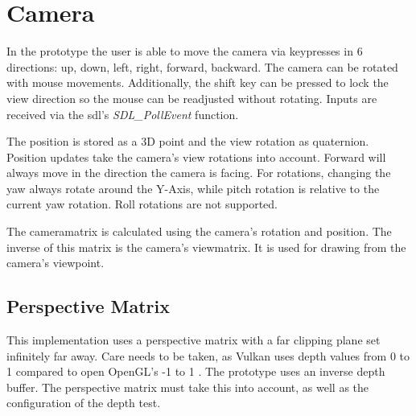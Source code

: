 








\section{Camera}
In the prototype the user is able to move the camera via keypresses in 6 directions: up, down, left, right, forward, backward. The camera can be rotated with mouse movements. Additionally, the shift key can be pressed to lock the view direction so the mouse can be readjusted without rotating. Inputs are received via the \gls{sdl}'s \cite{sdl} \textit{SDL\_PollEvent} function.

The position is stored as a 3D point and the view rotation as quaternion. Position updates take the camera's view rotations into account. Forward will always move in the direction the camera is facing. For rotations, changing the yaw always rotate around the Y-Axis, while pitch rotation is relative to the current yaw rotation. Roll rotations are not supported.

The \gls{cameramatrix} is calculated using the camera's rotation and position. The inverse of this matrix is the camera's \gls{viewmatrix}. It is used for drawing from the camera's viewpoint.

\subsection{Perspective Matrix}
This implementation uses a perspective matrix with a far clipping plane set infinitely far away. Care needs to be taken, as Vulkan uses depth values from 0 to 1 \cite{khronos:vulkan:spec1.1} compared to open OpenGL's -1 to 1 \cite{khronos:openGL:spec4.6}. The prototype uses an inverse depth buffer. The perspective matrix must take this into account, as well as the configuration of the depth test.

